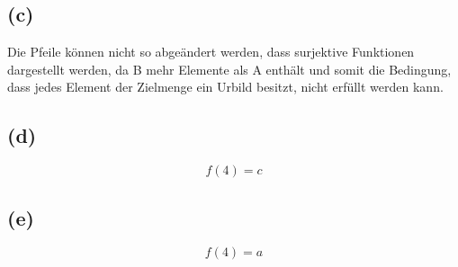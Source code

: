 \documentclass[11pt,a4paper]{article}
\begin{document}
\subsection{(c)}
Die Pfeile können nicht so abgeändert werden, dass surjektive Funktionen dargestellt werden, da B mehr Elemente als A enthält und somit die Bedingung, dass jedes Element der Zielmenge ein Urbild besitzt, nicht erfüllt werden kann.

\subsection{(d)}
\begin{equation}
f(4) = c
\end{equation}

\subsection{(e)}
\begin{equation}
f(4) = a
\end{equation}
\end{document}
